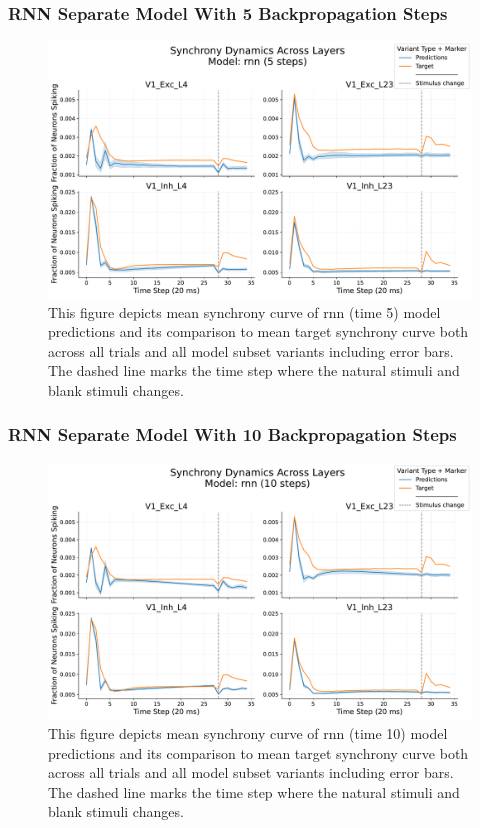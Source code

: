 \subsubsection{RNN Separate Model With 5 Backpropagation Steps}
\label{{subsubsec:rnn_5_eval}}
\begin{figure}
    \centering
    \includegraphics[width=\linewidth]{img/plots/separate_model_synchrony_curve_rnn_separate_5_evaluation.pdf}
    \caption{This figure depicts mean synchrony curve of rnn (time 5) model predictions and its comparison to mean target synchrony curve both across all trials and all model subset variants including error bars. The dashed line marks the time step where the natural stimuli and blank stimuli changes.}
    \label{fig:synchrony_curve_rnn_5}
\end{figure}


\subsubsection{RNN Separate Model With 10 Backpropagation Steps}
\label{{subsubsec:rnn_10_eval}}
\begin{figure}
    \centering
    \includegraphics[width=\linewidth]{img/plots/separate_model_synchrony_curve_rnn_separate_10_evaluation.pdf}
    \caption{This figure depicts mean synchrony curve of rnn (time 10) model predictions and its comparison to mean target synchrony curve both across all trials and all model subset variants including error bars. The dashed line marks the time step where the natural stimuli and blank stimuli changes.}
    \label{fig:synchrony_curve_rnn_10}
\end{figure}

